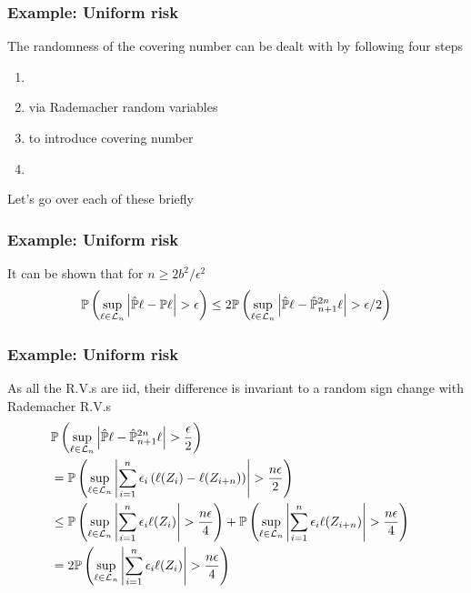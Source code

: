 \documentclass[12pt]{beamer}
\begin{document}
\begin{frame}[fragile]
\frametitle{Example: Uniform risk }
The randomness of the covering number can be dealt with by following four steps

\begin{enumerate}
\item {}
\item {} via Rademacher random variables
\item {} to introduce covering number
\item {}
\end{enumerate}
Let's go over each of these briefly
\end{frame}

\begin{frame}[fragile]
\frametitle{Example: Uniform risk }
 It can be shown that for $n \geq 2b^2/\epsilon^2$
\[
\P\left(\sup_{\ell \in \mathcal{L}_n} \left|  \hat\P\ell - \P\ell \right| > \epsilon \right) 
\leq 
2\P\left(\sup_{\ell \in \mathcal{L}_n} \left|  \hat\P\ell - \hat\P_{n+1}^{2n}\ell \right| > \epsilon/2 \right) 
\]
\end{frame}

\begin{frame}[fragile]
\frametitle{Example: Uniform risk }
As all the R.V.s are iid, their difference is invariant to a random sign change with Rademacher R.V.s
\begin{align*}
\lefteqn{\P\left(\sup_{\ell \in \mathcal{L}_n} \left|  \hat\P\ell - \hat\P_{n+1}^{2n}\ell \right| > \frac{\epsilon}{2}\right) } \\
& =
\P\left(\sup_{\ell \in \mathcal{L}_n} \left| \sum_{i=1}^n \epsilon_i \left(\ell(Z_i) - \ell(Z_{i + n})\right) \right| > \frac{n\epsilon}{2} \right)  \\
& \leq
\P\left(\sup_{\ell \in \mathcal{L}_n} \left| \sum_{i=1}^n \epsilon_i \ell(Z_i)\right| > \frac{n\epsilon}{4}\right)
+
\P\left(\sup_{\ell \in \mathcal{L}_n} \left| \sum_{i=1}^n \epsilon_i \ell(Z_{i+n})\right| > \frac{n\epsilon}{4}\right)\\
& =
2\P\left(\sup_{\ell \in \mathcal{L}_n} \left| \sum_{i=1}^n \epsilon_i \ell(Z_i)\right| > \frac{n\epsilon}{4}\right)
\end{align*}
\end{frame}
\end{document}

